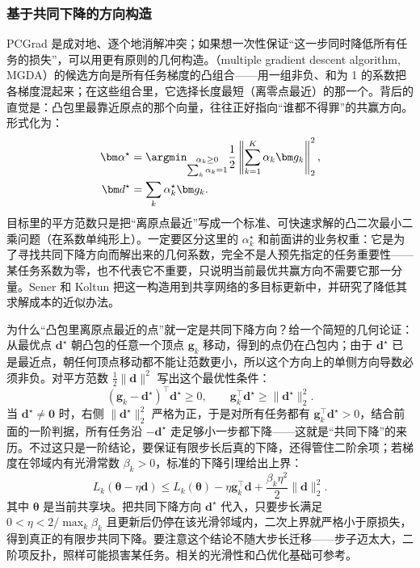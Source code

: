 \subsubsection{基于共同下降的方向构造}
\label{sec:ket-sharing-mgda}

PCGrad 是成对地、逐个地消解冲突；如果想一次性保证“这一步同时降低所有任务的损失”，可以用更有原则的几何构造。（multiple gradient descent algorithm, MGDA）的候选方向是所有任务梯度的凸组合——用一组非负、和为 1 的系数把各梯度混起来；在这些组合里，它选择长度最短（离零点最近）的那一个。背后的直觉是：凸包里最靠近原点的那个向量，往往正好指向“谁都不得罪”的共赢方向。形式化为：
\begin{align}
  \bm\alpha^\star
  &=\argmin_{\substack{\alpha_k\geq0\\\sum_k\alpha_k=1}}
  \frac12\left\|\sum_{k=1}^{K}\alpha_k\bm g_k\right\|_2^2,
  \nonumber\\
  \bm d^\star&=\sum_k\alpha_k^\star\bm g_k.
  \label{eq:ket-sharing-mgda}
\end{align}
目标里的平方范数只是把“离原点最近”写成一个标准、可快速求解的凸二次最小二乘问题（在系数单纯形上）。一定要区分这里的 $\alpha_k^\star$ 和前面讲的业务权重：它是为了寻找共同下降方向而解出来的几何系数，完全不是人预先指定的任务重要性——某任务系数为零，也不代表它不重要，只说明当前最优共赢方向不需要它那一分量。Sener 和 Koltun 把这一构造用到共享网络的多目标更新中，并研究了降低其求解成本的近似办法。

为什么“凸包里离原点最近的点”就一定是共同下降方向？给一个简短的几何论证：从最优点 $\bm d^\star$ 朝凸包的任意一个顶点 $\bm g_k$ 移动，得到的点仍在凸包内；由于 $\bm d^\star$ 已是最近点，朝任何顶点移动都不能让范数更小，所以这个方向上的单侧方向导数必须非负。对平方范数 $\frac12\|\bm d\|^2$ 写出这个最优性条件：
\begin{equation}
  (\bm g_k-\bm d^\star)^{\top}\bm d^\star\geq0,
  \qquad
  \bm g_k^{\top}\bm d^\star
  \geq\|\bm d^\star\|_2^2.
  \label{eq:ket-sharing-common-descent}
\end{equation}
当 $\bm d^\star
\ne\bm0$ 时，右侧 $\|\bm d^\star\|_2^2$ 严格为正，于是对所有任务都有 $\bm g_k^\top\bm d^\star>0$，结合前面的一阶判据，所有任务沿 $-\bm d^\star$ 走足够小一步都下降——这就是“共同下降”的来历。不过这只是一阶结论，要保证有限步长后真的下降，还得管住二阶余项；若梯度在邻域内有光滑常数 $\beta_k>0$，标准的下降引理给出上界：
\begin{equation}
  L_k(\bm\theta-\eta\bm d)
  \leq L_k(\bm\theta)
  -\eta\bm g_k^{\top}\bm d
  +\frac{\beta_k\eta^2}{2}\|\bm d\|_2^2.
\end{equation}
其中 $\bm\theta$ 是当前共享块。把共同下降方向 $\bm d^\star$ 代入，只要步长满足 $0<\eta<2/\max_k\beta_k$ 且更新后仍停在该光滑邻域内，二次上界就严格小于原损失，得到真正的有限步共同下降。要注意这个结论不随大步长迁移——步子迈太大，二阶项反扑，照样可能损害某任务。相关的光滑性和凸优化基础可参考。

